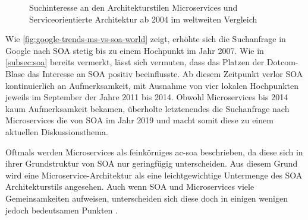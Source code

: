     \begin{figure}[h!]
      \vspace{.01\textheight}
      \centering
      \caption{Suchinteresse an den Architekturstilen Microservices und Serviceorientierte Architektur ab 2004 im weltweiten Vergleich \parencite{googletrends2020msvssoa}}
      \label{fig:google-trends-ms-vs-soa-world}
    \end{figure}
    
    Wie \autoref{fig:google-trends-ms-vs-soa-world} zeigt, erhöhte sich die Suchanfrage in Google nach SOA stetig bis zu einem Hochpunkt im Jahr 2007. Wie in \autoref{subsec:soa} bereits vermerkt, lässt sich vermuten, dass das Platzen der Dotcom-Blase das Interesse an SOA positiv beeinflusste. Ab diesem Zeitpunkt verlor SOA kontinuierlich an Aufmerksamkeit, mit Ausnahme von vier lokalen Hochpunkten jeweils im September der Jahre 2011 bis 2014. Obwohl Microservices bis 2014 kaum Aufmerksamkeit bekamen, überholte letztenendes die Suchanfrage nach Microservices die von SOA im Jahr 2019 und macht somit diese zu einem aktuellen Diskussionsthema.


    Oftmals werden Microservices als feinkörniges \gls{ac-soa} beschrieben, da diese sich in ihrer Grundstruktur von SOA nur geringfügig unterscheiden. Aus diesem Grund wird eine Microservice-Architektur als eine leichtgewichtige Untermenge des SOA Architekturstils angesehen. Auch wenn SOA und Microservices viele Gemeinsamkeiten aufweisen, unterscheiden sich diese doch in einigen wenigen jedoch bedeutsamen Punkten \parencites[S. 20]{takai2017architektur}[S. 584]{villamizar2015evaluating}.

